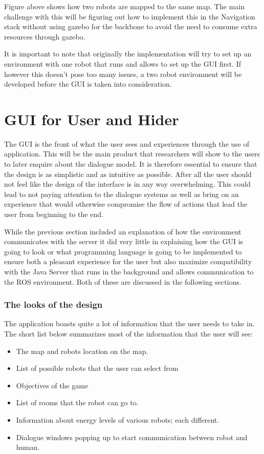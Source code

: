 \documentclass{report}
\begin{document}
      Figure above shows how two robots are mapped to the same map. The main challenge with this will be figuring out how to implement this in the Navigation stack without using gazebo for the backbone to avoid the need to consume extra resources through gazebo.

      It is important to note that originally the implementation will try to set up an environment with one robot that runs and allows to set up the GUI first. If however this doesn't pose too many issues, a two robot environment will be developed before the GUI is taken into consideration.

    \section{GUI for User and Hider}
      The GUI is the front of what the user sees and experiences through the use of application. This will be the main product that researchers will show to the users to later enquire about the dialogue model. It is therefore essential to ensure that the design is as simplistic and as intuitive as possible. After all the user should not feel like the design of the interface is in any way overwhelming. This could lead to not paying attention to the dialogue systems as well as bring on an experience that would otherwise compromise the flow of actions that lead the user from beginning to the end.

      While the previous section included an explanation of how the environment communicates with the server it did very little in explaining how the GUI is going to look or what programming language is going to be implemented to ensure both a pleasant experience for the user but also maximize compatibility with the Java Server that runs in the background and allows communication to the ROS environment. Both of these are discussed in the following sections.

      \subsubsection{The looks of the design}
        The application boasts quite a lot of information that the user needs to take in. The short list below summarizes most of the information that the user will see:
        \begin{itemize}
          \item The map and robots location on the map.
          \item List of possible robots that the user can select from
          \item Objectives of the game
          \item List of rooms that the robot can go to.
          \item Information about energy levels of various robots; each different.
          \item Dialogue windows popping up to start communication between robot and human.
        \end{itemize}
\end{document}
